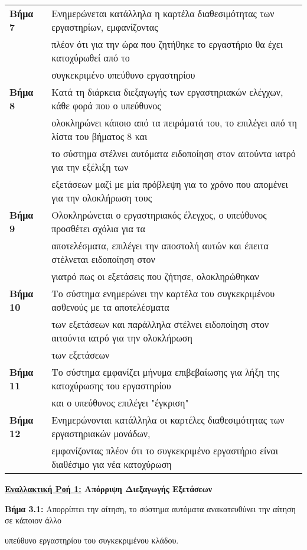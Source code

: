\documentclass{article}
\newcommand\T{\rule{0pt}{2.6ex}}       %
\newcommand\B{\rule[-1.2ex]{0pt}{0pt}}
\begin{document}
\begin{center}
\begin{tabular}{|l|l|}
      \hline
      \textbf{Βήμα 7} & Ενημερώνεται κατάλληλα η καρτέλα διαθεσιμότητας των εργαστηρίων, εμφανίζοντας\T\\& πλέον ότι για την ώρα που ζητήθηκε το εργαστήριο θα έχει κατοχύρωθεί από το \\&  συγκεκριμένο υπεύθυνο εργαστηρίου\B \\
      \hline
      \textbf{Βήμα 8} & Κατά τη διάρκεια διεξαγωγής των εργαστηριακών ελέγχων, κάθε φορά που ο υπεύθυνος \T\\& ολοκληρώνει κάποιο από τα πειράματά του, το επιλέγει από τη λίστα του βήματος 8  και \\& το σύστημα στέλνει αυτόματα ειδοποίηση στον αιτούντα ιατρό για την εξέλιξη των \\& εξετάσεων μαζί με μία πρόβλεψη για το χρόνο που απομένει για την ολοκλήρωση τους \B \\
      \hline
      \textbf{Βήμα 9} & Ολοκληρώνεται ο εργαστηριακός έλεγχος, ο υπεύθυνος προσθέτει σχόλια για τα \T\\& αποτελέσματα, επιλέγει την αποστολή αυτών και έπειτα στέλνεται ειδοποίηση στον \\& γιατρό πως οι εξετάσεις που ζήτησε, ολοκληρώθηκαν \B \\
      \hline
      \textbf{Βήμα 10} & Το σύστημα ενημερώνει την καρτέλα του συγκεκριμένου ασθενούς με τα αποτελέσματα\T\\& των εξετάσεων και παράλληλα στέλνει ειδοποίηση στον αιτούντα ιατρό για την ολοκλήρωση \\& των εξετάσεων \B \\
      \hline
      \textbf{Βήμα 11} & Το σύστημα εμφανίζει μήνυμα επιβεβαίωσης για λήξη της κατοχύρωσης του εργαστηρίου \T\\& και ο υπεύθυνος επιλέγει "έγκριση"\B \\
      \hline
      \textbf{Βήμα 12} & Ενημερώνονται κατάλληλα οι καρτέλες διαθεσιμότητας των εργαστηριακών μονάδων,\T\\& εμφανίζοντας πλέον ότι το συγκεκριμένο εργαστήριο είναι διαθέσιμο για νέα κατοχύρωση\B \\
      \hline
     \end{tabular}
 \end{center}
 
  \textbf{\underline{Εναλλακτική Ροή 1:} Απόρριψη Διεξαγωγής Εξετάσεων} \vspace{0.2cm}
\par \textbf{Βήμα 3.1:} Απορρίπτει την αίτηση, το σύστημα αυτόματα ανακατευθύνει την αίτηση σε κάποιον άλλο \par υπεύθυνο εργαστηρίου του συγκεκριμένου κλάδου. \vspace{0.2cm}
\end{document}
